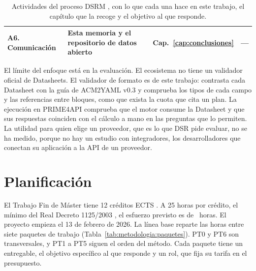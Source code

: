 \begin{table}[!htbp]
\begin{tabular}{|p{}|p{}|p{}|p{}|}
\hline
\raggedright A6. Comunicación & \raggedright Esta memoria y el repositorio de datos abierto & \raggedright Cap.~\ref{cap:conclusiones} & \raggedright --- \tabularnewline
\hline
\end{tabular}
\caption[Actividades del proceso DSRM]{Actividades del proceso DSRM \citep{peffers2007dsrm}, con lo que cada una hace en este trabajo, el capítulo que la recoge y el objetivo al que responde.}
\label{tab:metodologia:dsrm}
\end{table}

El límite del enfoque está en la evaluación. El ecosistema no tiene un validador oficial de Datasheets. El validador de formato es de este trabajo: contrasta cada Datasheet con la guía de ACM2YAML v0.3 y comprueba los tipos de cada campo y las referencias entre bloques, como que exista la cuota que cita un plan. La ejecución en PRIME4API comprueba que el motor consume la Datasheet y que sus respuestas coinciden con el cálculo a mano en las preguntas que lo permiten. La utilidad para quien elige un proveedor, que es lo que DSR pide evaluar, no se ha medido, porque no hay un estudio con integradores, los desarrolladores que conectan su aplicación a la API de un proveedor.

\section{Planificación}
\label{sec:metodologia:planificacion}

El Trabajo Fin de Máster tiene 12 créditos ECTS \citep{us2026tfm}. A
25 horas por crédito, el mínimo del Real Decreto 1125/2003
\citep{rd1125de2003}, el esfuerzo previsto es de ~horas.
El proyecto empieza el 13 de febrero de 2026. La línea base reparte las
horas entre siete paquetes de trabajo
(Tabla~\ref{tab:metodologia:paquetes}). PT0 y PT6 son transversales, y
PT1 a PT5 siguen el orden del método. Cada paquete tiene un entregable,
el objetivo específico al que responde y un rol, que fija su tarifa en
el presupuesto.

